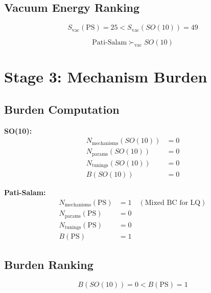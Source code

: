 \documentclass[11pt,a4paper]{article}
\begin{document}
\subsection{Vacuum Energy Ranking}
\label{subsec:evac-ranking}

\begin{equation}
\label{eq:evac-ranking}
S_{\text{vac}}(\text{PS}) = 25 < S_{\text{vac}}(SO(10)) = 49
\end{equation}

\begin{equation}
\label{eq:evac-winner}
\boxed{\text{Pati-Salam} \succ_{\text{vac}} SO(10)}
\end{equation}

\section{Stage 3: Mechanism Burden}
\label{sec:stage3-impl}

\subsection{Burden Computation}
\label{subsec:burden-comp}

\textbf{SO(10):}
\begin{align}
\label{eq:burden-so10}
N_{\text{mechanisms}}(SO(10)) &= 0 \\
N_{\text{params}}(SO(10)) &= 0 \\
N_{\text{tunings}}(SO(10)) &= 0 \\
B(SO(10)) &= 0
\end{align}

\textbf{Pati-Salam:}
\begin{align}
\label{eq:burden-ps}
N_{\text{mechanisms}}(\text{PS}) &= 1 \quad (\text{Mixed BC for LQ}) \\
N_{\text{params}}(\text{PS}) &= 0 \\
N_{\text{tunings}}(\text{PS}) &= 0 \\
B(\text{PS}) &= 1
\end{align}

\subsection{Burden Ranking}
\label{subsec:burden-ranking}

\begin{equation}
\label{eq:burden-ranking}
B(SO(10)) = 0 < B(\text{PS}) = 1
\end{equation}
\end{document}
